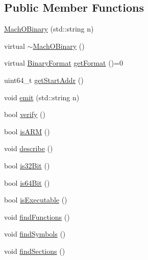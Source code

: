 \subsection*{\-Public \-Member \-Functions}
\begin{DoxyCompactItemize}
\item 
\hyperlink{class_e_p_a_x_1_1_mach_o_1_1_mach_o_binary_a753d91d032788ea99e964c5f7b59a003}{\-Mach\-O\-Binary} (std\-::string n)
\item 
virtual \hyperlink{class_e_p_a_x_1_1_mach_o_1_1_mach_o_binary_a5a255df5d7799f13411d3ecb2dda045d}{$\sim$\-Mach\-O\-Binary} ()
\item 
virtual \hyperlink{namespace_e_p_a_x_a4be639c006ef14def4708b37ee6dd67d}{\-Binary\-Format} \hyperlink{class_e_p_a_x_1_1_mach_o_1_1_mach_o_binary_a435106c1f40d1ec16ac539fbdecd88bd}{get\-Format} ()=0
\item 
uint64\-\_\-t \hyperlink{class_e_p_a_x_1_1_mach_o_1_1_mach_o_binary_a426e6fdd744908571c46e10608211df4}{get\-Start\-Addr} ()
\item 
void \hyperlink{class_e_p_a_x_1_1_mach_o_1_1_mach_o_binary_a3a4b9b3138d22d2455fbddb4c694f532}{emit} (std\-::string n)
\item 
bool \hyperlink{class_e_p_a_x_1_1_mach_o_1_1_mach_o_binary_aa0eb9a16309170238ca0d3cc027a116b}{verify} ()
\item 
bool \hyperlink{class_e_p_a_x_1_1_mach_o_1_1_mach_o_binary_a7d857ef9a99dc9d553e7e764234db957}{is\-A\-R\-M} ()
\item 
void \hyperlink{class_e_p_a_x_1_1_mach_o_1_1_mach_o_binary_a7142994ba41ef1a5fad2d34e75278764}{describe} ()
\item 
bool \hyperlink{class_e_p_a_x_1_1_mach_o_1_1_mach_o_binary_a6c3c547d72fe13a51b702fcfc6c1c271}{is32\-Bit} ()
\item 
bool \hyperlink{class_e_p_a_x_1_1_mach_o_1_1_mach_o_binary_a892a753783fa1feaa3f98fcad476da8a}{is64\-Bit} ()
\item 
bool \hyperlink{class_e_p_a_x_1_1_mach_o_1_1_mach_o_binary_a6031c2f4420ec57b008d33a27f490a51}{is\-Executable} ()
\item 
void \hyperlink{class_e_p_a_x_1_1_mach_o_1_1_mach_o_binary_a06e7ed071e394bd70b2a371b1360f591}{find\-Functions} ()
\item 
void \hyperlink{class_e_p_a_x_1_1_mach_o_1_1_mach_o_binary_a4c92ec8fe5a4c63d57b101f1e35f9291}{find\-Symbols} ()
\item 
void \hyperlink{class_e_p_a_x_1_1_mach_o_1_1_mach_o_binary_a91a0d99f8a2bf0ff9c6a0870eaf232cb}{find\-Sections} ()

\end{DoxyCompactItemize}
